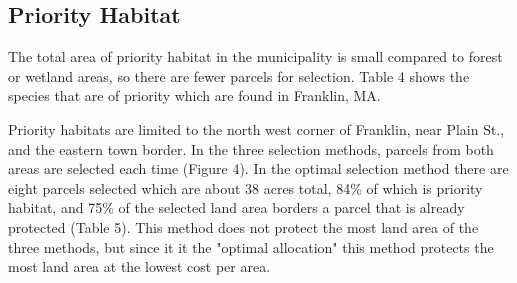 \documentclass[12pt, stu, floatsintext,table]{apa7}
\begin{document}
\subsection{Priority Habitat} 
The total area of priority habitat in the municipality is small compared to forest or wetland areas, so there are fewer parcels for selection. Table 4 shows the species that are of priority which are found in Franklin, MA. 
\begin{table}[h]
\caption{Rare species found in Franklin, MA sorted by most recent observation}
\end{table}
Priority habitats are limited to the north west corner of Franklin, near Plain St., and the eastern town border. In the three selection methods, parcels from both areas are selected each time (Figure 4). 
In the optimal selection method there are eight parcels selected which are about 38 acres total, 84\% of which is priority habitat, and 75\% of the selected land area borders a parcel that is already protected (Table 5). This method does not protect the most land area of the three methods, but since it it the "optimal allocation" this method protects the most land area at the lowest cost per area. 
\end{document}
